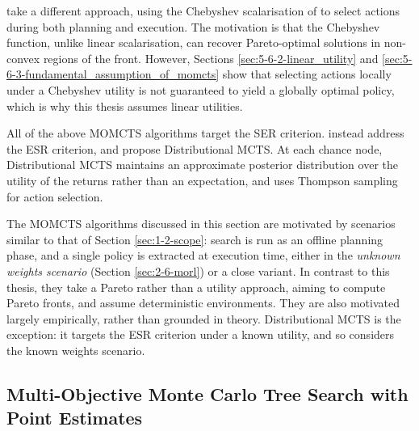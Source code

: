     \citet{chebyshev_momcts} take a different approach, using the Chebyshev scalarisation of \citet{moo_chebyshev} to select actions during both planning and execution. The motivation is that the Chebyshev function, unlike linear scalarisation, can recover Pareto-optimal solutions in non-convex regions of the front. However, Sections \ref{sec:5-6-2-linear_utility} and \ref{sec:5-6-3-fundamental_assumption_of_momcts} show that selecting actions locally under a Chebyshev utility is not guaranteed to yield a globally optimal policy, which is why this thesis assumes linear utilities.

    All of the above MOMCTS algorithms target the SER criterion. \citet{dmcts,dmcts_long} instead address the ESR criterion, and propose Distributional MCTS. At each chance node, Distributional MCTS maintains an approximate posterior distribution over the utility of the returns rather than an expectation, and uses Thompson sampling for action selection. 

    The MOMCTS algorithms discussed in this section are motivated by scenarios similar to that of Section \mbox{\ref{sec:1-2-scope}}: search is run as an offline planning phase, and a single policy is extracted at execution time, either in the \textit{unknown weights scenario} (Section \mbox{\ref{sec:2-6-morl}}) or a close variant. In contrast to this thesis, they take a Pareto rather than a utility approach, aiming to compute Pareto fronts, and assume deterministic environments. They are also motivated largely empirically, rather than grounded in theory. Distributional MCTS is the exception: it targets the ESR criterion under a known utility, and so considers the known weights scenario.





\subsection{Multi-Objective Monte Carlo Tree Search with Point Estimates}
\label{sec:3-5-1-point_estimates}

